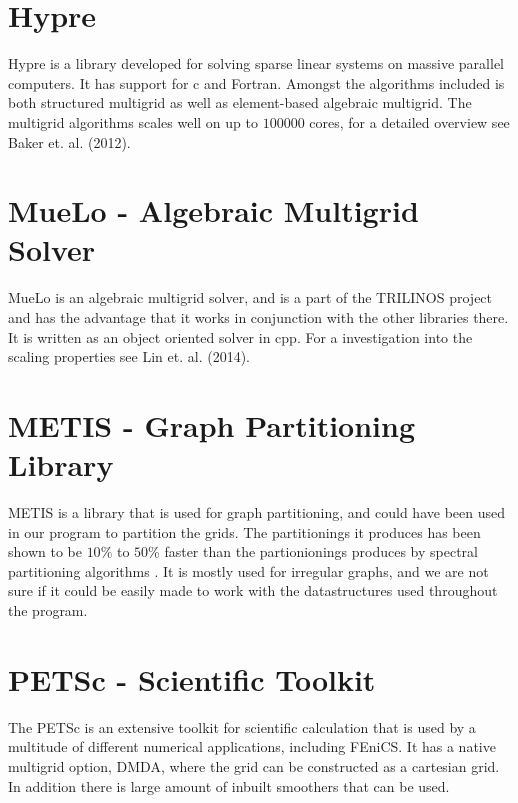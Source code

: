 \section{Hypre}
Hypre is a library developed for solving sparse linear systems on massive parallel computers. It has support for c and Fortran. Amongst the algorithms included is both structured multigrid as well as element-based algebraic multigrid. The multigrid algorithms scales well on up to \(100 000\) cores, for a detailed overview see Baker et. al. (2012).

\section{MueLo - Algebraic Multigrid Solver}
MueLo is an algebraic multigrid solver, and is a part of the TRILINOS project and has the advantage that it works in conjunction with the other libraries there. It is written as an object oriented solver in cpp. For a investigation into the scaling properties see Lin et. al. (2014).


\section{METIS - Graph Partitioning Library}
METIS is a library that is used for graph partitioning, and could have been used in our program to partition the grids. The partitionings it produces has been shown to be \(10\%\) to \(50\%\) faster than the partionionings produces by spectral partitioning algorithms \citep{_fast_????}. It is mostly used for irregular graphs, and we are not sure if it could be easily made to work with the datastructures used throughout the program.


\section{PETSc - Scientific Toolkit}
The PETSc is an extensive toolkit for scientific calculation that is used by a multitude of different numerical applications, including FEniCS. It has a native multigrid option, DMDA, where the grid can be constructed as a cartesian grid. In addition there is large amount of inbuilt smoothers that can be used.
